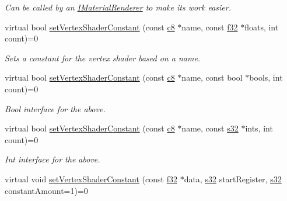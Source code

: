 \begin{DoxyCompactItemize}
\begin{DoxyCompactList}\small\item\em Can be called by an \hyperlink{classirr_1_1video_1_1IMaterialRenderer}{I\+Material\+Renderer} to make its work easier. \end{DoxyCompactList}\item 
virtual bool \hyperlink{classirr_1_1video_1_1IMaterialRendererServices_a294db14b4f3608d29d0e457246df3d16}{set\+Vertex\+Shader\+Constant} (const \hyperlink{namespaceirr_a9395eaea339bcb546b319e9c96bf7410}{c8} $\ast$name, const \hyperlink{namespaceirr_a0277be98d67dc26ff93b1a6a1d086b07}{f32} $\ast$floats, int count)=0
\begin{DoxyCompactList}\small\item\em Sets a constant for the vertex shader based on a name. \end{DoxyCompactList}\item 
\mbox{\label{classirr_1_1video_1_1IMaterialRendererServices_aed8c3f830451ec416265202d2dc90f92}} 
virtual bool \hyperlink{classirr_1_1video_1_1IMaterialRendererServices_aed8c3f830451ec416265202d2dc90f92}{set\+Vertex\+Shader\+Constant} (const \hyperlink{namespaceirr_a9395eaea339bcb546b319e9c96bf7410}{c8} $\ast$name, const bool $\ast$bools, int count)=0
\begin{DoxyCompactList}\small\item\em Bool interface for the above. \end{DoxyCompactList}\item 
\mbox{\label{classirr_1_1video_1_1IMaterialRendererServices_a4dc7be8f9a786b9805c46f535ff7d896}} 
virtual bool \hyperlink{classirr_1_1video_1_1IMaterialRendererServices_a4dc7be8f9a786b9805c46f535ff7d896}{set\+Vertex\+Shader\+Constant} (const \hyperlink{namespaceirr_a9395eaea339bcb546b319e9c96bf7410}{c8} $\ast$name, const \hyperlink{namespaceirr_ac66849b7a6ed16e30ebede579f9b47c6}{s32} $\ast$ints, int count)=0
\begin{DoxyCompactList}\small\item\em Int interface for the above. \end{DoxyCompactList}\item 
virtual void \hyperlink{classirr_1_1video_1_1IMaterialRendererServices_a1f11a6df7625205511e91fb036e03929}{set\+Vertex\+Shader\+Constant} (const \hyperlink{namespaceirr_a0277be98d67dc26ff93b1a6a1d086b07}{f32} $\ast$data, \hyperlink{namespaceirr_ac66849b7a6ed16e30ebede579f9b47c6}{s32} start\+Register, \hyperlink{namespaceirr_ac66849b7a6ed16e30ebede579f9b47c6}{s32} constant\+Amount=1)=0

\end{DoxyCompactItemize}
